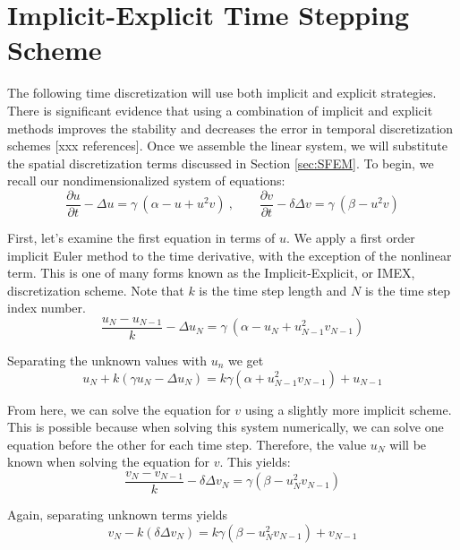 \documentclass[12pt]{article}
\begin{document}
\section{Implicit-Explicit Time Stepping Scheme}\label{sec:imex}

The following time discretization will use both implicit and explicit strategies. There is significant evidence that using a combination of implicit and explicit methods improves the stability and decreases the error in temporal discretization schemes [xxx references]. Once we assemble the  linear system, we will substitute the spatial discretization terms discussed in Section \ref{sec:SFEM}. To begin, we recall our nondimensionalized system of equations:
\begin{equation}
\frac{\partial u}{\partial t} - \Delta u = \gamma~(\alpha - u + u^2v) ~,~~~~~~~~~
\frac{\partial v}{\partial t} - \delta\Delta v = \gamma~(\beta - u^2v)
\end{equation}

\noindent First, let's examine the first equation in terms of $u$. We apply a first order implicit Euler method to the time derivative, with the exception of the nonlinear term. This is one of many forms known as the Implicit-Explicit, or IMEX, discretization scheme. Note that $k$ is the time step length and $N$ is the time step index number.
\begin{equation}
\frac{u_N - u_{N-1}}{k} - \Delta u_N = \gamma~(\alpha - u_N + u_{N-1}^2v_{N-1}) 
\end{equation}

\noindent Separating the unknown values with $u_n$ we get
\begin{equation}
u_N+k\left(\gamma u_N - \Delta u_N\right) = k\gamma\left(\alpha + u_{N-1}^2v_{N-1} \right) + u_{N-1}
\end{equation}


From here, we can solve the equation for $v$ using a slightly more implicit scheme. This is possible because when solving this system numerically, we can solve one equation before the other for each time step. Therefore, the value $u_N$ will be known when solving the equation for $v$. This yields:
\begin{equation}
\frac{v_N - v_{N-1}}{k} - \delta\Delta v_N = \gamma(\beta - u_N^2v_{N-1})
\end{equation}

\noindent Again, separating unknown terms yields
\begin{equation}
v_N-k\left(\delta\Delta v_N\right) = k\gamma\left(\beta - u_{N}^2v_{N-1} \right) + v_{N-1}
\end{equation}
\end{document}
